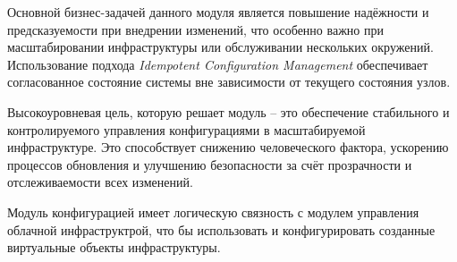 Основной бизнес-задачей данного модуля является повышение надёжности и предсказуемости при внедрении изменений, что особенно важно при масштабировании инфраструктуры или обслуживании нескольких окружений. Использование подхода \textit{Idempotent Configuration Management} обеспечивает согласованное состояние системы вне зависимости от текущего состояния узлов.

Высокоуровневая цель, которую решает модуль -- это обеспечение стабильного и контролируемого управления конфигурациями в масштабируемой инфраструктуре. Это способствует снижению человеческого фактора, ускорению процессов обновления и улучшению безопасности за счёт прозрачности и отслеживаемости всех изменений.

Модуль конфигурацией имеет логическую связность с модулем управления облачной инфраструктрой, что бы использовать и конфигурировать созданные виртуальные объекты инфраструктуры.
